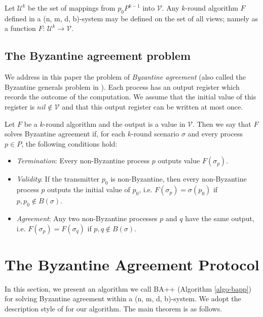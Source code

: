 \documentclass[11pt,conference,compsoc,onecolumn,romanappendices]{IEEEtran}
\newcommand{\nin}{\not\in}
\newcommand{\tmem}[1]{{\em #1\/}}
\newenvironment{itemizedot}{\begin{itemize} \renewcommand{\labelitemi}{$\bullet$}\renewcommand{\labelitemii}{$\bullet$}\renewcommand{\labelitemiii}{$\bullet$}\renewcommand{\labelitemiv}{$\bullet$}}{\end{itemize}}
\begin{document}
Let $\mathcal{U}^k$ be the set of
mappings from $p_0 P^{k - 1}$ into $\mathcal{V}$. Any $k$-round algorithm $F$
defined in a (n, m, d, b)-system may be defined on the set of all views;
namely as a function $F$: $\mathcal{U}^k \rightarrow \mathcal{V}$.


\subsection{The Byzantine agreement problem}\label{model-BA}

We  address in this paper the problem of {\tmem{Byzantine agreement}}
 (also called the Byzantine generals problem in \cite{lamport1982byzantine}).
Each process has an output register which records the outcome of
the computation. We assume that the initial value of this register is 
$nil \notin \mathcal{V}$ and that this  output register can be written at most once.

Let $F$ be a $k$-round algorithm and the output is a value in $\mathcal{V}$. Then we say that $F$
solves Byzantine agreement if, for each $k$-round scenario $\sigma$ and every
process $p \in P$, the following conditions hold:
\begin{itemizedot}

  \item {\tmem{Termination}}: Every non-Byzantine process $p$ outputs value $F (\sigma_p)$.

  \item {\tmem{Validity}}: If the transmitter $p_0$ is non-Byzantine, then every
  non-Byzantine process  $p$ outputs the initial value of $p_0$,
  i.e. $F (\sigma_p) = \sigma (p_0)$ if $p, p_0 \nin B
  (\sigma)$.
  
  \item {\tmem{Agreement}}: Any two non-Byzantine processes $p$ and $q$  have the same
  output, i.e. $F (\sigma_p) = F (\sigma_q)$ if $p, q \nin B (\sigma)$.

\end{itemizedot}

\section{The Byzantine Agreement Protocol}\label{sec-algorithm}



In this section, we present an algorithm we call {BA++} (Algorithm \ref{algo-bapp}) for solving
Byzantine agreement within a (n, m, d, b)-system.
We adopt the description style of \cite{fischer1982lower} for our algorithm.
The main theorem is as follows.
\end{document}
